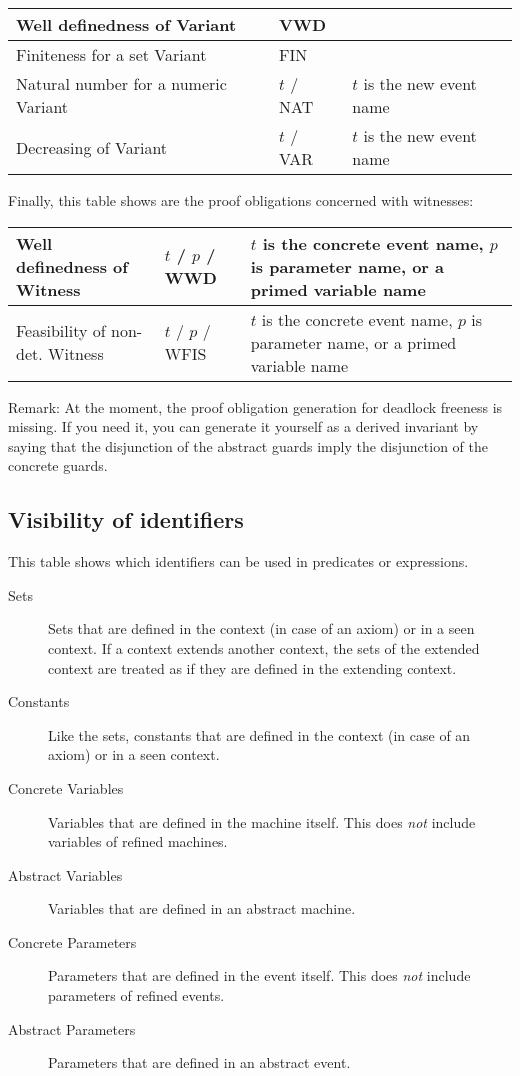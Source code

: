 \begin{center}
    \begin{tabular}{| p{6cm} | p{3cm} | p{5cm} |}
    \hline
	Well definedness of Variant & VWD & \\ \hline
	Finiteness for a set Variant & FIN &  \\ \hline
	Natural number for a numeric Variant & $t$  / NAT & $t$ is the new event name \\ \hline
	Decreasing of Variant & $t$  / VAR & $t$ is the new event name  \\ \hline
    \end{tabular}
\end{center}

Finally, this table shows are the proof obligations concerned with witnesses:

\begin{center}
    \begin{tabular}{| p{6cm} | p{3cm} | p{5cm} |}
    \hline
	Well definedness of Witness & $t$  / $p$  / WWD & $t$ is the concrete event name, $p$ is parameter name, or a primed variable name \\ \hline
	Feasibility of non-det. Witness & $t$  / $p$  / WFIS & $t$ is the concrete event name, $p$ is parameter name, or a primed variable name \\ \hline
    \end{tabular}
\end{center}

Remark: At the moment, the proof obligation generation for deadlock freeness is missing. If you need it, you can generate it yourself as a derived invariant by saying that the disjunction of the abstract guards imply the disjunction of the concrete guards.

\subsection{Visibility of identifiers}
\label{visibility_of_identifiers}

This table shows which identifiers can be used in predicates or expressions. 
\begin{description}
\item[Sets] Sets that are defined in the context (in case of an axiom) or in a seen context.
  If a context extends another context, the sets of the extended context are treated as if they
  are defined in the extending context.
\item[Constants] Like the sets, constants that are defined in the context (in case of an axiom) or
  in a seen context.
\item[Concrete Variables] Variables that are defined in the machine itself. This does \emph{not}
  include variables of refined machines.
\item[Abstract Variables] Variables that are defined in an abstract machine.
\item[Concrete Parameters] Parameters that are defined in the event itself. This does \emph{not}
  include parameters of refined events.
\item[Abstract Parameters] Parameters that are defined in an abstract event.
\end{description}

